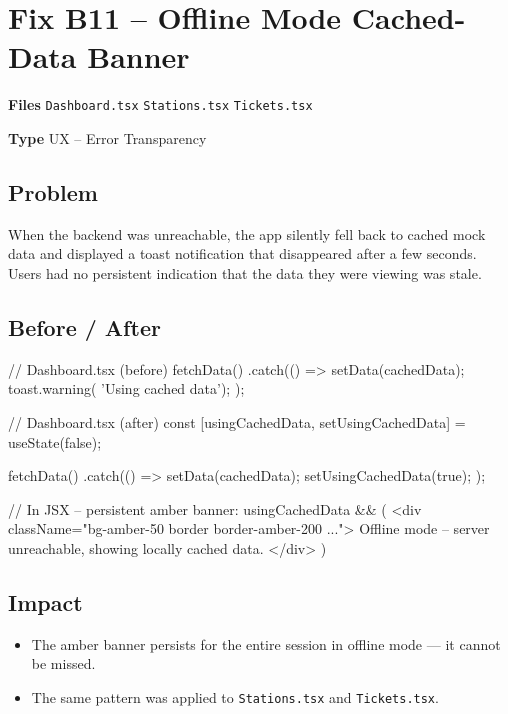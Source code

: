\documentclass[12pt,a4paper]{report}
\newcommand{\diffL}{\noindent\begin{minipage}[t]{0.485\linewidth}}
\newcommand{\diffR}{\end{minipage}\hfill\begin{minipage}[t]{0.485\linewidth}}
\newcommand{\diffend}{\end{minipage}\par\smallskip}
\newcommand{\inforow}[2]{%
	\noindent
	\begin{tcolorbox}[
		colback   = lightblue,
		colframe  = midblue,
		arc       = 2pt,
		left      = 6pt, right = 6pt, top = 2pt, bottom = 2pt,
		sidebyside, sidebyside align = top seam,
		lefthand width = 3.2cm,
		segmentation hidden,
		]
		\textbf{\color{brandblue}\small #1}
		\tcblower
		{\small\color{labelgray} #2}
	\end{tcolorbox}\vspace{2pt}%
}
\newcommand{\file}[1]{\texttt{\small #1}}
\begin{document}
	\section{Fix B11 -- Offline Mode Cached-Data Banner}

	\inforow{Files}{\file{Dashboard.tsx} \quad \file{Stations.tsx} \quad \file{Tickets.tsx}}
	\inforow{Type}{UX -- Error Transparency}

	\subsection*{Problem}

	When the backend was unreachable, the app silently fell back to
	cached mock data and displayed a toast notification that disappeared
	after a few seconds. Users had no persistent indication that the
	data they were viewing was stale.

	\subsection*{Before / After}

	\diffL
	\begin{beforecode}
// Dashboard.tsx (before)
fetchData()
  .catch(() => {
    setData(cachedData);
    toast.warning(
      'Using cached data');
  });
	\end{beforecode}
	\diffR
	\begin{aftercode}
// Dashboard.tsx (after)
const [usingCachedData,
  setUsingCachedData] =
  useState(false);

fetchData()
  .catch(() => {
    setData(cachedData);
    setUsingCachedData(true);
  });

// In JSX -- persistent amber banner:
{usingCachedData && (
  <div className="bg-amber-50
    border border-amber-200 ...">
    Offline mode -- server
    unreachable, showing locally
    cached data.
  </div>
)}
	\end{aftercode}
	\diffend

	\subsection*{Impact}
	\begin{itemize}
		\item The amber banner persists for the entire session in offline mode --- it cannot be missed.
		\item The same pattern was applied to \texttt{Stations.tsx} and \texttt{Tickets.tsx}.
	\end{itemize}
\end{document}

